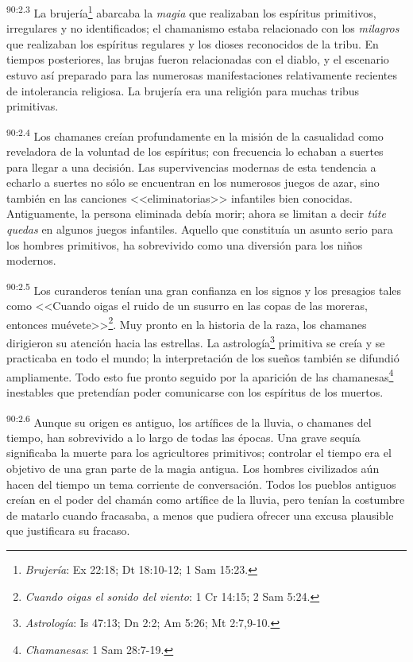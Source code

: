 \documentclass[twoside, 11pt]{book}
\begin{document}
\par
\textsuperscript{90:2.3} La brujería\footnote{\textit{Brujería}: Ex 22:18; Dt 18:10-12; 1 Sam 15:23.} abarcaba la \textit{magia} que realizaban los espíritus primitivos, irregulares y no identificados; el chamanismo estaba relacionado con los \textit{milagros} que realizaban los espíritus regulares y los dioses reconocidos de la tribu. En tiempos posteriores, las brujas fueron relacionadas con el diablo, y el escenario estuvo así preparado para las numerosas manifestaciones relativamente recientes de intolerancia religiosa. La brujería era una religión para muchas tribus primitivas.

\par
\textsuperscript{90:2.4} Los chamanes creían profundamente en la misión de la casualidad como reveladora de la voluntad de los espíritus; con frecuencia lo echaban a suertes para llegar a una decisión. Las supervivencias modernas de esta tendencia a echarlo a suertes no sólo se encuentran en los numerosos juegos de azar, sino también en las canciones <<eliminatorias>> infantiles bien conocidas. Antiguamente, la persona eliminada debía morir; ahora se limitan a decir \textit{túte quedas} en algunos juegos infantiles. Aquello que constituía un asunto serio para los hombres primitivos, ha sobrevivido como una diversión para los niños modernos.

\par
\textsuperscript{90:2.5} Los curanderos tenían una gran confianza en los signos y los presagios tales como <<Cuando oigas el ruido de un susurro en las copas de las moreras, entonces muévete>>\footnote{\textit{Cuando oigas el sonido del viento}: 1 Cr 14:15; 2 Sam 5:24.}. Muy pronto en la historia de la raza, los chamanes dirigieron su atención hacia las estrellas. La astrología\footnote{\textit{Astrología}: Is 47:13; Dn 2:2; Am 5:26; Mt 2:7,9-10.} primitiva se creía y se practicaba en todo el mundo; la interpretación de los sueños también se difundió ampliamente. Todo esto fue pronto seguido por la aparición de las chamanesas\footnote{\textit{Chamanesas}: 1 Sam 28:7-19.} inestables que pretendían poder comunicarse con los espíritus de los muertos.

\par
\textsuperscript{90:2.6} Aunque su origen es antiguo, los artífices de la lluvia, o chamanes del tiempo, han sobrevivido a lo largo de todas las épocas. Una grave sequía significaba la muerte para los agricultores primitivos; controlar el tiempo era el objetivo de una gran parte de la magia antigua. Los hombres civilizados aún hacen del tiempo un tema corriente de conversación. Todos los pueblos antiguos creían en el poder del chamán como artífice de la lluvia, pero tenían la costumbre de matarlo cuando fracasaba, a menos que pudiera ofrecer una excusa plausible que justificara su fracaso.
\end{document}
